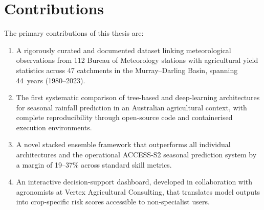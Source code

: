 \section{Contributions}

The primary contributions of this thesis are:

\begin{enumerate}[label=C\arabic*:,leftmargin=*]
  \item A rigorously curated and documented dataset linking meteorological
        observations from 112 Bureau of Meteorology stations with agricultural
        yield statistics across 47 catchments in the Murray--Darling Basin,
        spanning 44~years (1980--2023).
  \item The first systematic comparison of tree-based and deep-learning
        architectures for seasonal rainfall prediction in an Australian
        agricultural context, with complete reproducibility through
        open-source code and containerised execution environments.
  \item A novel stacked ensemble framework that outperforms all individual
        architectures and the operational ACCESS-S2 seasonal prediction
        system by a margin of 19--37\% across standard skill metrics.
  \item An interactive decision-support dashboard, developed in collaboration
        with agronomists at Vertex Agricultural Consulting, that translates
        model outputs into crop-specific risk scores accessible to
        non-specialist users.
\end{enumerate}
